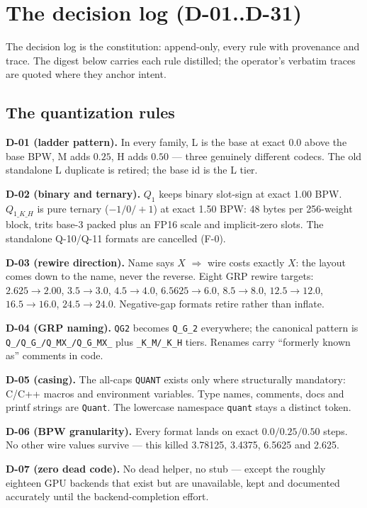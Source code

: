 \chapter{The decision log (D-01..D-31)}

The decision log is the constitution: append-only, every rule with provenance and trace. The
digest below carries each rule distilled; the operator's verbatim traces are quoted where they
anchor intent.

\section{The quantization rules}

\textbf{D-01 (ladder pattern).} In every family, L is the base at exact $0.0$ above the base
BPW, M adds $0.25$, H adds $0.50$ --- three genuinely different codecs. The old standalone L
duplicate is retired; the base id is the L tier.

\textbf{D-02 (binary and ternary).} $Q_1$ keeps binary slot-sign at exact 1.00 BPW. $Q_{1\_K\_H}$
is pure ternary ($-1/0/+1$) at exact 1.50 BPW: 48 bytes per 256-weight block, trits base-3
packed plus an FP16 scale and implicit-zero slots. The standalone Q-10/Q-11 formats are
cancelled (F-0).

\textbf{D-03 (rewire direction).} Name says $X$ $\Rightarrow$ wire costs exactly $X$: the
layout comes down to the name, never the reverse. Eight GRP rewire targets:
$2.625\!\to\!2.00$, $3.5\!\to\!3.0$, $4.5\!\to\!4.0$, $6.5625\!\to\!6.0$, $8.5\!\to\!8.0$,
$12.5\!\to\!12.0$, $16.5\!\to\!16.0$, $24.5\!\to\!24.0$. Negative-gap formats retire rather
than inflate.

\textbf{D-04 (GRP naming).} \texttt{QG2} becomes \texttt{Q\_G\_2} everywhere; the canonical
pattern is \texttt{Q\_/Q\_G\_/Q\_MX\_/Q\_G\_MX\_} plus \texttt{\_K\_M/\_K\_H} tiers. Renames
carry ``formerly known as'' comments in code.

\textbf{D-05 (casing).} The all-caps \texttt{QUANT} exists only where structurally mandatory:
C/C++ macros and environment variables. Type names, comments, docs and printf strings are
\texttt{Quant}. The lowercase namespace \texttt{quant} stays a distinct token.

\textbf{D-06 (BPW granularity).} Every format lands on exact $0.0/0.25/0.50$ steps. No other
wire values survive --- this killed 3.78125, 3.4375, 6.5625 and 2.625.

\textbf{D-07 (zero dead code).} No dead helper, no stub --- except the roughly eighteen GPU
backends that exist but are unavailable, kept and documented accurately until the
backend-completion effort.

